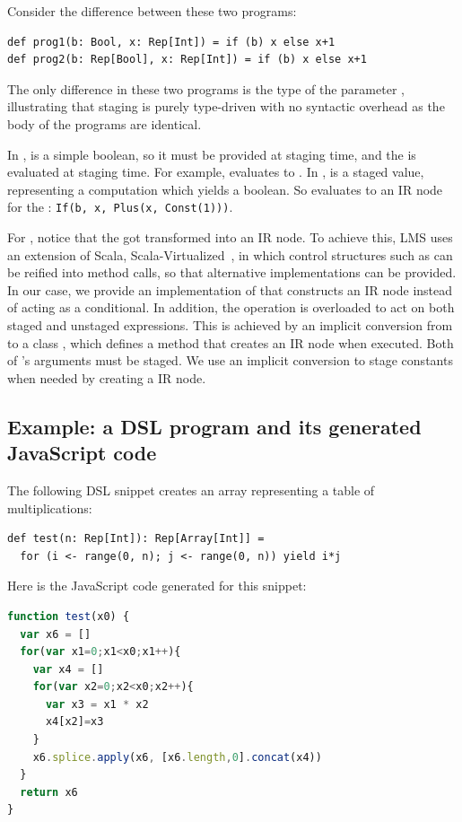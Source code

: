 \documentclass[runningheads,a4paper]{llncs}
\begin{document}
Consider the difference between these two programs:
\begin{lstlisting}
def prog1(b: Bool, x: Rep[Int]) = if (b) x else x+1
def prog2(b: Rep[Bool], x: Rep[Int]) = if (b) x else x+1
\end{lstlisting}

The only difference in these two programs is the type of the parameter
, illustrating that staging is purely type-driven with no
syntactic overhead as the body of the programs are identical.

In ,  is a simple boolean, so it must be provided
at staging time, and the  is evaluated at staging time. For
example,  evaluates to . In ,
 is a staged value, representing a computation which yields a
boolean. So  evaluates to an IR node for the :
{\tt\small If(b, x, Plus(x, Const(1)))}.

For , notice that the  got transformed into an IR
node. To achieve this, LMS uses an extension of Scala,
Scala-Virtualized~\cite{scala-virtualized}, in which control
structures such as  can be reified into method calls, so that
alternative implementations can be provided. In our case, we provide an
implementation of  that constructs an IR node instead of
acting as a conditional. In addition, the \code{+} operation is
overloaded to act on both staged and unstaged expressions. This is
achieved by an implicit conversion from  to a class
, which defines a \code{+} method that creates an IR node
 when executed. Both of 's arguments must be
staged. We use an implicit conversion to stage constants when needed
by creating a  IR node.

\subsection{Example: a DSL program and its generated JavaScript code}

The following DSL snippet creates an array representing a table of
multiplications:
\begin{lstlisting}
def test(n: Rep[Int]): Rep[Array[Int]] =
  for (i <- range(0, n); j <- range(0, n)) yield i*j
\end{lstlisting}

Here is the JavaScript code generated for this snippet:
\begin{lstlisting}[language=JavaScript]
function test(x0) {
  var x6 = []
  for(var x1=0;x1<x0;x1++){
    var x4 = []
    for(var x2=0;x2<x0;x2++){
      var x3 = x1 * x2
      x4[x2]=x3
    }
    x6.splice.apply(x6, [x6.length,0].concat(x4))
  }
  return x6
}
\end{lstlisting}
\end{document}
